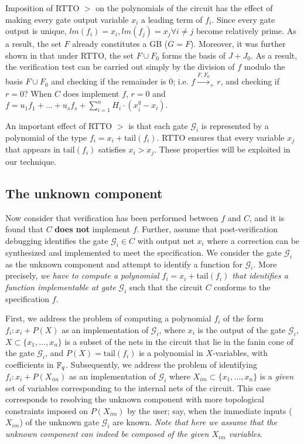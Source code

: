 Imposition of RTTO $>$ on the polynomials of the circuit has the
effect of making every gate output variable $x_i$ a leading term of
$f_i$. Since every gate output is unique, $lm(f_i)=x_i, lm(f_j)=x_j
\forall i\neq j$ become relatively prime. As a result, the set $F$ 
already constitutes a GB ($G=F$). Moreover, it was further shown in
\cite{lv:tcad2013} that under RTTO, the set $F \cup F_0$ forms the
\Grobner basis of $J + J_0$. As a result, the verification test
can be carried out simply by the division of $f$ modulo the \Grobner
basis $F\cup F_0$ and checking if the remainder is 0; i.e. $f
\xrightarrow{F,F_0}_+r$, and checking if $r = 0$? When $C$ does
implement $f$, $r=0$ and $f = u_1f_1+\dots+u_sf_s + \sum_{i=1}^n
H_i\cdot(x_i^q-x_i)$. 

An important effect of RTTO $>$ is that each gate $\mathcal{G}_i$ is
represented by a polynomial of the type $f_i = x_i +
\text{tail}(f_i)$.  RTTO ensures that
every variable $x_j$ that appears in $\text{tail}(f_i)$ satisfies
$x_i>x_j$. These properties will be exploited in our technique. 

\subsection{The unknown component}
Now consider that verification has been performed between $f$ and $C$,
and it is found that $C$ {\bf does not} implement $f$. Further, assume
that post-verification debugging identifies the gate $\mathcal{G}_i
\in C$ with output net $x_i$ where a correction can be synthesized and
implemented to meet the specification. We consider the gate
$\mathcal{G}_i$ as the unknown component and attempt to identify a
function for $\mathcal{G}_i$. More precisely, {\it we have to compute
  a polynomial $f_i = x_i + \text{tail}(f_i)$ that identifies a
  function implementable at gate $\mathcal{G}_i$} such that the
circuit $C$ conforms to the specification $f$. 

First, we address the problem of computing a polynomial
$f_i$ of the form $f_i:x_i+P(X)$ as an implementation of
$\mathcal{G}_i$, where $x_i$ is the output of the gate
$\mathcal{G}_i$, $X \subset \{x_1,\dots,x_n\}$ is a subset of the nets
in the circuit that lie in the fanin cone of the gate $\mathcal{G}_i$,
and $P(X) = \text{tail}(f_i)$ is a polynomial in $X$-variables,
with coefficients in ${\mathbb{F}}_{q}$. Subsequently, we address the problem of
identifying $f_i:x_i+P(X_{im})$ as an implementation of
$\mathcal{G}_i$ where  $X_{im} \subset \{x_1,\dots,x_n\}$ is a {\it
  given} set of variables corresponding to the internal nets of the
circuit. This case corresponds to resolving the unknown component with
more topological constraints imposed on $P(X_{im})$ by the user; say,
when the immediate inputs ($X_{im}$) of the unknown gate
$\mathcal{G}_i$ are known.  {\it Note that here we assume that the
  unknown component can indeed be composed of the given $X_{im}$
  variables}. 


